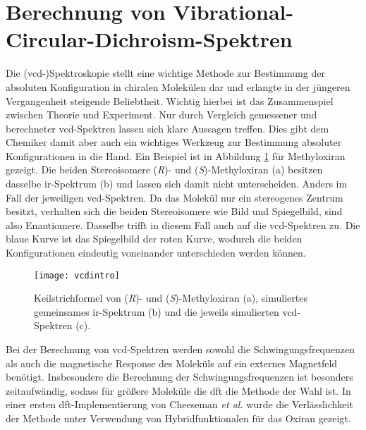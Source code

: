 \section{Berechnung von Vibrational\--Circular\--Dichroism\--Spektren}\label{kap:vcd}
Die \mbox{(\acs{vcd}-)}Spektroskopie stellt eine wichtige Methode zur Bestimmung der absoluten Konfiguration in chiralen Molekülen dar und erlangte in der jüngeren Vergangenheit steigende Beliebtheit. Wichtig hierbei ist das Zusammenspiel zwischen Theorie und Experiment. Nur durch Vergleich gemessener und berechneter \ac{vcd}-Spektren lassen sich klare Aussagen treffen. Dies gibt dem Chemiker damit aber auch ein wichtiges Werkzeug zur Bestimmung absoluter Konfigurationen in die Hand.\supercite{magyarfalvi2011vibrational} Ein Beispiel ist in Abbildung \ref{abb:vcdintro} für Methyloxiran gezeigt. Die beiden Stereoisomere (\textit{R})- und (\textit{S})-Methyloxiran \textsf{(a)} besitzen dasselbe \ac{ir}-Spektrum \textsf{(b)} und lassen sich damit nicht unterscheiden. Anders im Fall der jeweiligen \ac{vcd}-Spektren. Da das Molekül nur ein stereogenes Zentrum besitzt, verhalten sich die beiden Stereoisomere wie Bild und Spiegelbild, sind also Enantiomere. Dasselbe trifft in diesem Fall auch auf die \ac{vcd}-Spektren zu. Die blaue Kurve ist das Spiegelbild der roten Kurve, wodurch die beiden Konfigurationen eindeutig voneinander unterschieden werden können. 

\begin{figure}[ht!]
	\centering
	\texttt{[image: vcdintro]}
	\captionsetup{figurewithin = chapter}
	\captionsetup{font=small, labelfont=bf}\caption[\ac{ir}- und \ac{vcd}-Spektren von (\textit{R})- und (\textit{S})-Methyloxiran]{Keilstrichformel von (\textcolor{myblue}{\textit{R}})- und (\textcolor{myred}{\textit{S}})-Methyloxiran \textsf{(a)}, simuliertes gemeinsames \ac{ir}-Spektrum \textsf{(b)} und die jeweils simulierten \ac{vcd}-Spektren \textsf{(c)}.}
\label{abb:vcdintro}
\end{figure}

Bei der Berechnung von \ac{vcd}-Spektren werden sowohl die Schwingungsfrequenzen als auch die magnetische Response des Moleküls auf ein externes Magnetfeld benötigt.\supercite{reiter2017vibrational} Insbesondere die Berechnung der Schwingungsfrequenzen ist besonders zeitaufwändig, sodass für größere Moleküle die \ac{dft} die Methode der Wahl ist. In einer ersten \ac{dft}-Implementierung von Cheeseman \textit{et al.}\supercite{cheeseman1996ab} wurde die Verlässlichkeit der Methode unter Verwendung von Hybridfunktionalen für das Oxiran gezeigt. 
\FloatBarrier

